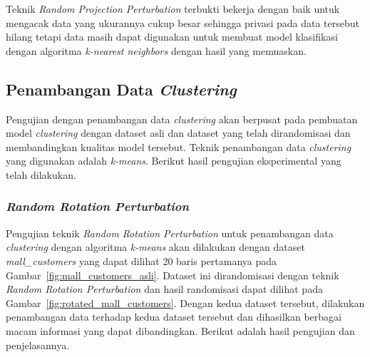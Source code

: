 Teknik \textit{Random Projection Perturbation} terbukti bekerja dengan baik untuk mengacak data yang ukurannya cukup besar sehingga privasi pada data tersebut hilang tetapi data masih dapat digunakan untuk membuat model klasifikasi dengan algoritma \textit{k-nearest neighbors} dengan hasil yang memuaskan.

\subsection{Penambangan Data \textit{Clustering}}
\label{subsec:pengujian-clustering}

Pengujian dengan penambangan data \textit{clustering} akan berpusat pada pembuatan model \textit{clustering} dengan dataset asli dan dataset yang telah dirandomisasi dan membandingkan kualitas model tersebut. Teknik penambangan data \textit{clustering} yang digunakan adalah \textit{k-means}. Berikut hasil pengujian eksperimental yang telah dilakukan.

\subsubsection{\textit{Random Rotation Perturbation}}
\label{subsubsec:pengujian-clustering-rrp}

Pengujian teknik \textit{Random Rotation Perturbation} untuk penambangan data \textit{clustering} dengan algoritma \textit{k-means} akan dilakukan dengan dataset \textit{mall\_customers} yang dapat dilihat 20 baris pertamanya pada Gambar~\ref{fig:mall_customers_asli}. Dataset ini dirandomisasi dengan teknik \textit{Random Rotation Perturbation} dan hasil randomisasi dapat dilihat pada Gambar~\ref{fig:rotated_mall_customers}. Dengan kedua dataset tersebut, dilakukan penambangan data terhadap kedua dataset tersebut dan dihasilkan berbagai macam informasi yang dapat dibandingkan. Berikut adalah hasil pengujian dan penjelasannya.

